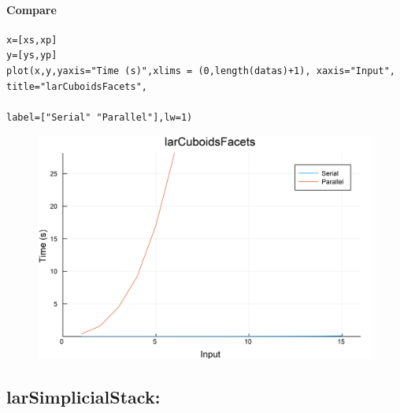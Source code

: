 \documentclass{article}
\begin{document}
\paragraph{Compare}
\begin{flushleft}\small
\begin{list}{}{} \item
    \begin{Verbatim}[tabsize=4]
x=[xs,xp]
y=[ys,yp]
plot(x,y,yaxis="Time (s)",xlims = (0,length(datas)+1), xaxis="Input", title="larCuboidsFacets",
                                                                        label=["Serial" "Parallel"],lw=1)
    \end{Verbatim}
\end{list}
\end{flushleft} 
\begin{figure}[h!]
\centering
\includegraphics[scale=0.06]{larCuboidsFacetsCom.png}
\end{figure}


\subsection{larSimplicialStack:}
\vspace{1ex}
\end{document}
